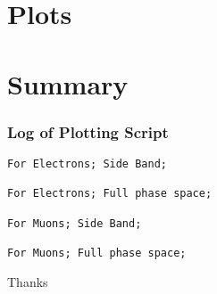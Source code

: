 \documentclass[slidestop,compress,mathserif]{beamer}
\begin{document}
 
\section{Plots}

\section{Summary}

\begin{frame}\frametitle{Log of Plotting Script}
\begin{verbatim}
For Electrons; Side Band;

For Electrons; Full phase space;

For Muons; Side Band;

For Muons; Full phase space;

\end{verbatim}
\end{frame}


\label{lastslide}
\begin{frame}[c]
	\begin{center}
	\Huge Thanks
	\end{center}
\end{frame}

\end{document}

